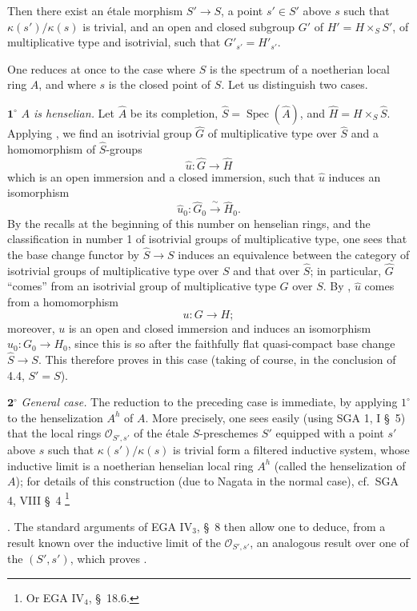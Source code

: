 \smallskip
Then there exist an étale morphism \(S'\to S\), a point \(s'\in S'\) above
\(s\) such that \(\kappa(s')/\kappa(s)\) is trivial, and an open and closed
subgroup \(G'\) of \(H'=H\times_S S'\), of multiplicative type and
isotrivial, such that \(G'_{s'}=H'_{s'}\).
\par\endgroup

One reduces at once to the case where \(S\) is the spectrum of a noetherian
local ring \(A\), and where \(s\) is the closed point of \(S\). Let us
distinguish two cases.

\par\smallskip\noindent
\(\mathbf{1^\circ}\) \emph{\(A\) is henselian.}
Let \(\widehat A\) be its completion,
\(\widehat S=\operatorname{Spec}(\widehat A)\), and
\(\widehat H=H\times_S\widehat S\). Applying , we find an
isotrivial group \(\widehat G\) of multiplicative type over \(\widehat S\)
and a homomorphism of \(\widehat S\)-groups
\[
  \widehat u:\widehat G\longrightarrow\widehat H
\]
which is an open immersion and a closed immersion, such that \(\widehat u\)
induces an isomorphism
\[
  \widehat u_0:\widehat G_0\xrightarrow{\ \sim\ }\widehat H_0.
\]
By the recalls at the beginning of this number on henselian rings, and the
classification in number 1 of isotrivial groups of multiplicative type, one
sees that the base change functor by \(\widehat S\to S\) induces an
equivalence between the category of isotrivial groups of multiplicative type
over \(S\) and that over \(\widehat S\); in particular, \(\widehat G\)
``comes'' from an isotrivial group of multiplicative type \(G\) over \(S\).
By , \(\widehat u\) comes from a homomorphism
\[
  u:G\longrightarrow H;
\]
moreover, \(u\) is an open and closed immersion and induces an isomorphism
\(u_0:G_0\to H_0\), since this is so after the faithfully flat
quasi-compact base change \(\widehat S\to S\). This therefore proves
 in this case (taking of course, in the conclusion of 4.4,
\(S'=S\)).

\par\smallskip\noindent
\(\mathbf{2^\circ}\) \emph{General case.}
The reduction to the preceding case is immediate, by applying \(1^\circ\) to
the henselization \(A^h\) of \(A\). More precisely, one sees easily (using
SGA 1, I \S~5) that the local rings \(\mathcal O_{S',s'}\) of the étale
\(S\)-preschemes \(S'\) equipped with a point \(s'\) above \(s\) such that
\(\kappa(s')/\kappa(s)\) is trivial form a filtered inductive system, whose
inductive limit is a noetherian henselian local ring \(A^h\) (called the
henselization of \(A\)); for details of this construction (due to Nagata in
the normal case), cf.\ SGA 4, VIII \S~4%
\begingroup
\renewcommand{\thefootnote}{\(\ast\)}
\footnote{Or EGA IV\(_4\), \S~18.6.}
\addtocounter{footnote}{-1}
\endgroup. The standard arguments of EGA IV\(_3\), \S~8 then allow one to
deduce, from a result known over the inductive limit of the
\(\mathcal O_{S',s'}\), an analogous result over one of the \((S',s')\), which
proves .

